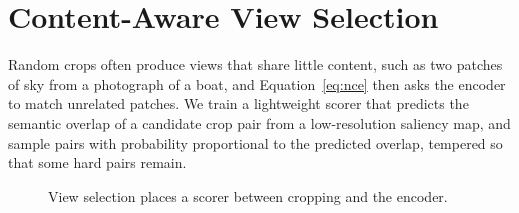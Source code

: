 \chapter{Content-Aware View Selection}
\label{ch:method}

Random crops often produce views that share little content, such as two patches of sky from a
photograph of a boat, and Equation~\eqref{eq:nce} then asks the encoder to match unrelated
patches. We train a lightweight scorer that predicts the semantic overlap of a candidate crop
pair from a low-resolution saliency map, and sample pairs with probability proportional to the
predicted overlap, tempered so that some hard pairs remain.

\begin{figure}[htbp]
  \centering
  \caption{View selection places a scorer between cropping and the encoder.}
  \label{fig:views}
\end{figure}
